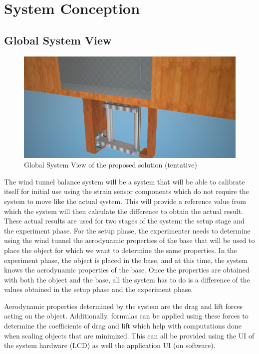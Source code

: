 \section{System Conception}
	\subsection{Global System View}

		\begin{figure}[H]
			\centering
				\includegraphics[scale=0.40]{img/globalview}
			\caption{Global System View of the proposed solution (tentative)}
		\end{figure}

		The wind tunnel balance system will be a system that will be able to calibrate itself for initial use using the strain sensor components which do not require the system to move like the actual system. This will provide a reference value from which the system will then calculate the difference to obtain the actual result. These actual results are used for two stages of the system: the setup stage and the experiment phase. For the setup phase, the experimenter needs to determine using the wind tunnel the aerodynamic properties of the base that will be used to place the object for which we want to determine the same properties. In the experiment phase, the object is placed in the base, and at this time, the system knows the aerodynamic properties of the base. Once the properties are obtained with both the object and the base, all the system has to do is a difference of the values obtained in the setup phase and the experiment phase.

		Aerodynamic properties determined by the system are the drag and lift forces acting on the object. Additionally, formulas can be applied using these forces to determine the coefficients of drag and lift which help with computations done when scaling objects that are minimized. This can all be provided using the UI of the system hardware (LCD) as well the application UI (on software). 


